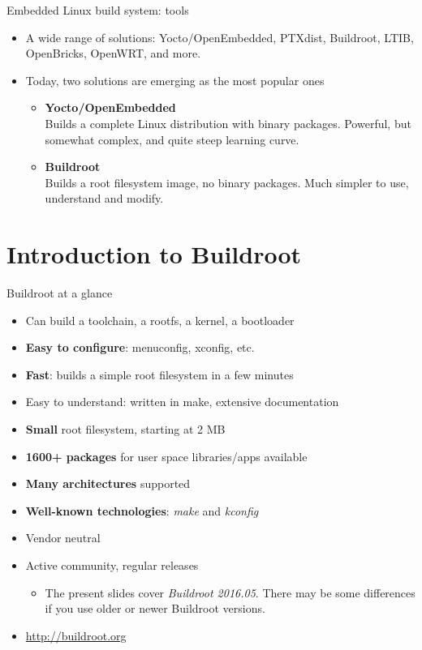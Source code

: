 \begin{frame}{Embedded Linux build system: tools}
  \begin{itemize}
  \item A wide range of solutions: Yocto/OpenEmbedded, PTXdist,
    Buildroot, LTIB, OpenBricks, OpenWRT, and more.
  \item Today, two solutions are emerging as the most popular ones
    \begin{itemize}
    \item {\bf Yocto/OpenEmbedded}\\Builds a complete Linux
      distribution with binary packages. Powerful, but somewhat
      complex, and quite steep learning curve.
    \item {\bf Buildroot}\\Builds a root filesystem image, no binary
      packages. Much simpler to use, understand and modify.
    \end{itemize}
  \end{itemize}
\end{frame}

\section{Introduction to Buildroot}

\begin{frame}{Buildroot at a glance}
  \begin{itemize}
  \item Can build a toolchain, a rootfs, a kernel, a bootloader
  \item {\bf Easy to configure}: menuconfig, xconfig, etc.
  \item {\bf Fast}: builds a simple root filesystem in a few minutes
  \item Easy to understand: written in make, extensive documentation
  \item {\bf Small} root filesystem, starting at 2 MB
  \item {\bf 1600+ packages} for user space libraries/apps available
  \item {\bf Many architectures} supported
  \item {\bf Well-known technologies}: {\em make} and {\em kconfig}
  \item Vendor neutral
  \item Active community, regular releases
    \begin{itemize}
    \item The present slides cover {\em Buildroot 2016.05}. There may
      be some differences if you use older or newer Buildroot versions.
    \end{itemize}
  \item \url{http://buildroot.org}
  \end{itemize}
\end{frame}

